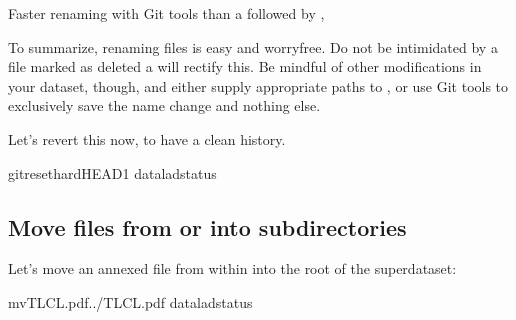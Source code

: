 \begin{findoutmore}[label={fom-gitmv}, before title={\thetcbcounter\ }, float, floatplacement=tb, check odd page=true]{Faster renaming with Git tools}
\sphinxAtStartPar
{} than a  followed by ,


\end{findoutmore}

\sphinxAtStartPar
To summarize, renaming files is easy and worry\sphinxhyphen{}free. Do not be intimidated
by a file marked as deleted \textendash{} a  will rectify this.
Be mindful of other modifications in your dataset, though, and either supply
appropriate paths to , or use Git tools to exclusively save
the name change and nothing else.

\sphinxAtStartPar
Let’s revert this now, to have a clean history.

\begin{sphinxVerbatim}[commandchars=\\\{\}]
gitreset\PYGZhy{}\PYGZhy{}hardHEAD\PYGZti{}1
dataladstatus
\end{sphinxVerbatim}

\ignorespaces 

\subsection{Move files from or into subdirectories}
\label{\detokenize{basics/101-136-filesystem:move-files-from-or-into-subdirectories}}\label{\detokenize{basics/101-136-filesystem:index-3}}
\sphinxAtStartPar
Let’s move an annexed file from within  into the root
of the superdataset:

\begin{sphinxVerbatim}[commandchars=\\\{\}]
mvTLCL.pdf../TLCL.pdf
dataladstatus
\end{sphinxVerbatim}

